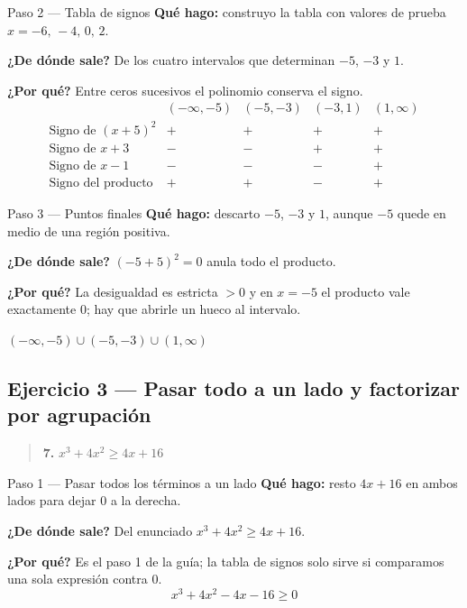 \documentclass[11pt]{article}
\begin{document}
\begin{paso}{Paso 2 --- Tabla de signos}
\textbf{Qué hago:} construyo la tabla con valores de prueba $x=-6,\,-4,\,0,\,2$.

\textbf{¿De dónde sale?} De los cuatro intervalos que determinan $-5$, $-3$ y $1$.

\textbf{¿Por qué?} Entre ceros sucesivos el polinomio conserva el signo.
\[
\begin{array}{l|cccc}
 & (-\infty,-5) & (-5,-3) & (-3,1) & (1,\infty)\\\hline
\text{Signo de } (x+5)^2 & + & + & + & +\\
\text{Signo de } x+3 & - & - & + & +\\
\text{Signo de } x-1 & - & - & - & +\\\hline
\text{Signo del producto} & + & + & - & +
\end{array}
\]
\end{paso}

\begin{paso}{Paso 3 --- Puntos finales}
\textbf{Qué hago:} descarto $-5$, $-3$ y $1$, aunque $-5$ quede en medio de una región positiva.

\textbf{¿De dónde sale?} $(-5+5)^2=0$ anula todo el producto.

\textbf{¿Por qué?} La desigualdad es estricta $>0$ y en $x=-5$ el producto vale exactamente $0$; hay que abrirle un hueco al intervalo.
\end{paso}

\begin{resp}
$(-\infty,-5)\cup(-5,-3)\cup(1,\infty)$
\end{resp}

\subsection*{Ejercicio 3 — Pasar todo a un lado y factorizar por agrupación}

\begin{quote}
\textbf{7.} $x^3+4x^2\ge 4x+16$
\end{quote}

\begin{paso}{Paso 1 --- Pasar todos los términos a un lado}
\textbf{Qué hago:} resto $4x+16$ en ambos lados para dejar $0$ a la derecha.

\textbf{¿De dónde sale?} Del enunciado $x^3+4x^2\ge 4x+16$.

\textbf{¿Por qué?} Es el paso 1 de la guía; la tabla de signos solo sirve si comparamos una sola expresión contra $0$.
\[
x^3+4x^2-4x-16\ge 0
\]
\end{paso}
\end{document}
